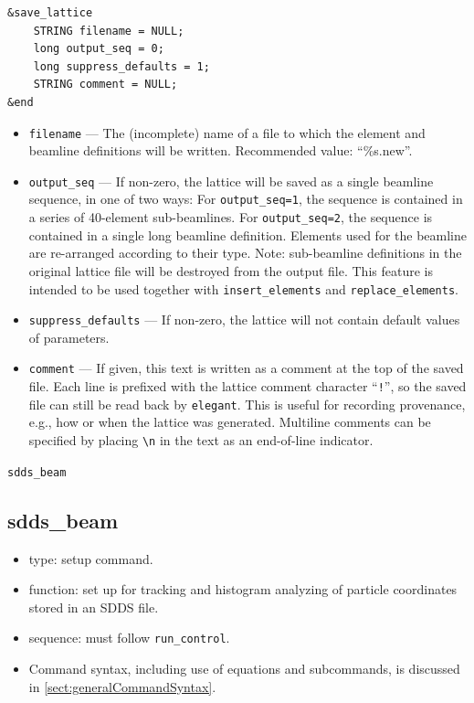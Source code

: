 \documentclass[11pt]{article}
\begin{document}
\begin{verbatim}
&save_lattice
    STRING filename = NULL;
    long output_seq = 0;
    long suppress_defaults = 1;
    STRING comment = NULL;
&end
\end{verbatim}

\begin{itemize}
\item \verb|filename| --- The (incomplete) name of a file to which the element and beamline definitions
will be written.  Recommended value: ``\%s.new''.
\item \verb|output_seq| --- If non-zero, the lattice will be saved as a single beamline sequence, in one of
  two ways: For \verb|output_seq=1|, the sequence is contained in a series of 40-element sub-beamlines.
  For \verb|output_seq=2|, the sequence is contained in a single long beamline definition.
Elements used for the beamline are re-arranged according to their type. Note: 
sub-beamline definitions in the original lattice file will be destroyed from the output file.
This feature is intended to be used 
together with \verb|insert_elements| and \verb|replace_elements|.
\item \verb|suppress_defaults| --- If non-zero, the lattice will not contain default values of parameters.
\item \verb|comment| --- If given, this text is written as a comment at the top of the saved file.
Each line is prefixed with the lattice comment character ``\verb|!|'', so the saved file can still be
read back by \verb|elegant|. This is useful for recording provenance, e.g., how or when the lattice
was generated. Multiline comments can be specified by  placing \verb|\n| in the text as an end-of-line indicator.
\end{itemize}

\newpage
\begin{center}{\Large\verb|sdds_beam|}\end{center}
\subsection{sdds\_beam \label{subsec:sddsbeam}}

\begin{itemize}
\item type: setup command.
\item function: set up for tracking and histogram analyzing of particle coordinates stored in an SDDS file.
\item sequence: must follow \verb|run_control|.
\item Command syntax, including use of equations and subcommands, is discussed in \ref{sect:generalCommandSyntax}.
\end{itemize}
\end{document}
